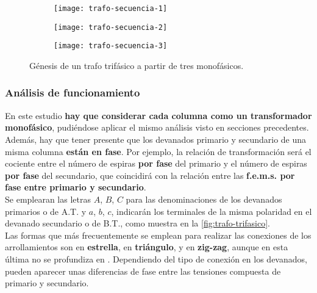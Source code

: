 \begin{figure}[H]
	\centering
	\begin{subfigure}[b]{.2\linewidth}
		\texttt{[image: trafo-secuencia-1]}
		\caption{}
		\label{fig:secuencia-1}
	\end{subfigure}
	\begin{subfigure}[b]{.2\linewidth}
		\texttt{[image: trafo-secuencia-2]}
		\caption{}
		\label{fig:secuencia-2}
	\end{subfigure}
	\begin{subfigure}[b]{.2\linewidth}
		\texttt{[image: trafo-secuencia-3]}
		\caption{}
		\label{fig:secuencia-3}
	\end{subfigure}
	\caption{Génesis de un trafo trifásico a partir de tres monofásicos.}
	\label{fig:trafo-secuencia}
\end{figure}

\subsubsection{Análisis de funcionamiento}


En este estudio \textbf{hay que considerar cada columna como un transformador monofásico}, pudiéndose aplicar el mismo análisis visto en secciones precedentes.
Además, hay que tener presente que los devanados primario y secundario de una misma columna \textbf{están en fase}. Por ejemplo,
la relación de transformación será el cociente entre el número de espiras \textbf{por fase} del primario y el número de espiras \textbf{por fase} del secundario, que coincidirá con la relación entre las \textbf{f.e.m.s. por fase entre primario y secundario}.\\ %

Se emplearan las letras $A$, $B$, $C$ para las denominaciones de los devanados primarios o de A.T. y $a$, $b$, $c$, indicarán los terminales de la misma polaridad en el devanado secundario o de B.T., como muestra en la \ref{fig:trafo-trifasico}.\\

Las formas que más frecuentemente se emplean para realizar las conexiones de los arrollamientos son en \textbf{estrella}, en \textbf{triángulo}, y en \textbf{zig-zag}, aunque en esta última no se profundiza en \materia. Dependiendo del tipo de conexión en los devanados, pueden aparecer unas diferencias de fase entre las tensiones compuesta de primario y secundario.

